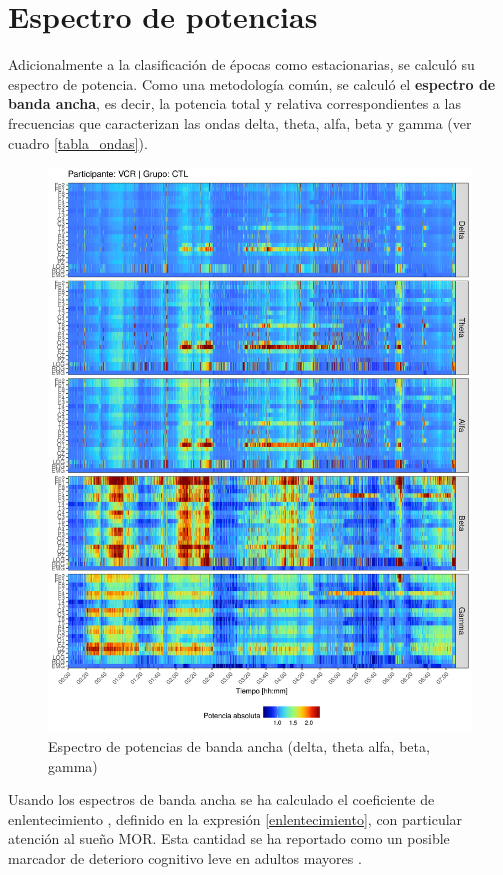 \section{Espectro de potencias}

Adicionalmente a la clasificación de épocas como estacionarias, se calculó su espectro de potencia. 
Como una metodología común, se calculó el \textbf{espectro de banda ancha},
es decir, la potencia total y relativa correspondientes a las frecuencias que caracterizan las ondas 
delta, theta, alfa, beta y gamma (ver cuadro \ref{tabla_ondas}).

\begin{figure}
\centering
\includegraphics[width=\linewidth]
{./img_art_dfa/VCNNS1_espectral_total.png} 
\caption[Espectro de potencias de banda ancha]{Espectro de potencias de banda ancha (delta, theta
alfa, beta, gamma)}
\end{figure}

Usando los espectros de banda ancha se ha calculado el coeficiente de enlentecimiento \lento, 
definido en la 
expresión \ref{enlentecimiento}, con particular atención al sueño MOR. Esta cantidad
se ha reportado como un posible marcador de deterioro cognitivo leve en adultos mayores 
\cite{Brayet16}.

